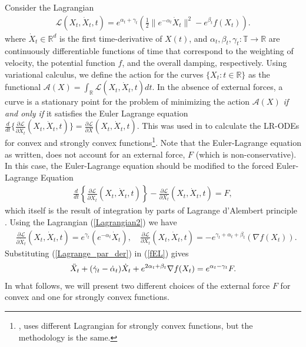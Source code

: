 \documentclass{article}
\theoremstyle{plain}
\theoremstyle{definition}
\theoremstyle{remark}
\begin{document}
Consider the Lagrangian
\begin{align}\label{Lagrangian2}
    \mathcal{L}(X_t,\dot{X}_t,t) =e^{\alpha_t+\gamma_t}\left(\frac{1}{2}\|e^{-\alpha_t}\dot{X}_t\|^2-e^{\beta_t}f(X_t)\right). 
\end{align}
where \(\dot{X}_t\in \mathbb{R}^d\) is the first time-derivative of \(X(t)\), and \(\alpha_t,\beta_t,\gamma_t:\mathbb{T}\rightarrow \mathbb{R}\) are continuously differentiable functions of time that correspond to the weighting of velocity, the potential function \(f\), and the overall damping, respectively. Using variational calculus, we define the action for the curves \(\{X_t:t\in \mathbb R\}\) as the functional \(\mathcal{A}(X)=\int_{\mathbb R}\mathcal{L}(X_t,\dot X_t,t)dt \). In the absence of external forces, a curve is a stationary point for the problem of minimizing the action \(\mathcal{A}(X)\) \textit{if and only if} it satisfies the Euler Lagrange equation \({\tfrac{d}{dt}\{  \tfrac{\partial \mathcal{L}}{\partial \dot{X}_t}(X_t,\dot{X}_t,t)  \}=\tfrac{\partial \mathcal{L}}{\partial X}(X_t,\dot{X}_t,t)}\). This was used in \citep{WibisonoE7351,wilson2021lyapunov} to calculate the LR-ODEs for convex and strongly convex functions\footnote{\citep{wilson2021lyapunov}, uses different Lagrangian for strongly convex functions, but the methodology is the same.}. Note that the Euler-Lagrange equation as written, does not account for an external force, \(F\) (which is non-conservative). In this case, the Euler-Lagrange equation should be modified to the forced Euler-Lagrange Equation
\begin{align}\label{fEL}
        \frac{d}{dt}\left\{  \frac{\partial \mathcal{L}}{\partial \dot{X}_t}(X_t,\dot{X}_t,t)  \right\}-\frac{\partial \mathcal{L}}{\partial X_t}(X_t,\dot{X}_t,t)=F,
\end{align}
which itself is the result of integration by parts of Lagrange d'Alembert principle \citep{campos2021discrete}. Using the Lagrangian (\ref{Lagrangian2}) we have
\begin{align}\label{Lagrange_par_der}
  &   \frac{\partial \mathcal{L}}{\partial \dot{X}_t}(X_t,\dot{X}_t,t)  =e^{\gamma_t}(e^{-\alpha_t}\dot{X}_t),\quad \frac{\partial \mathcal{L}}{\partial X_t}(X_t,\dot{X}_t,t)= -e^{\gamma_t+\alpha_t+\beta_t}(\nabla f(X_t)).
\end{align}
Substituting (\ref{Lagrange_par_der}) in (\ref{fEL}) gives
\begin{align}\label{HR_general_ODE_F}
    \Ddot{X}_t + (\dot{\gamma}_t-\dot{\alpha}_t)\dot{X}_t+e^{2\alpha_t+\beta_t}\nabla f(X_t) =e^{\alpha_t-\gamma_t} F.
\end{align}
In what follows, we will present two different choices of the external force \(F\) for convex and one for strongly convex functions. 
\end{document}
